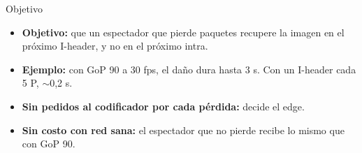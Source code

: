 \documentclass[aspectratio=169, 12pt]{beamer}
\begin{document}
\begin{frame}{Objetivo}
    \begin{itemize}
        \item \textbf{Objetivo:} que un espectador que pierde paquetes recupere la imagen en el próximo I-header, y no en el próximo intra.
        \item \textbf{Ejemplo:} con GoP 90 a 30 fps, el daño dura hasta 3 s. Con un I-header cada 5 P, $\sim$0,2 s.
        \item \textbf{Sin pedidos al codificador por cada pérdida:} decide el edge.
        \item \textbf{Sin costo con red sana:} el espectador que no pierde recibe lo mismo que con GoP 90.
    \end{itemize}
\end{frame}
\end{document}

